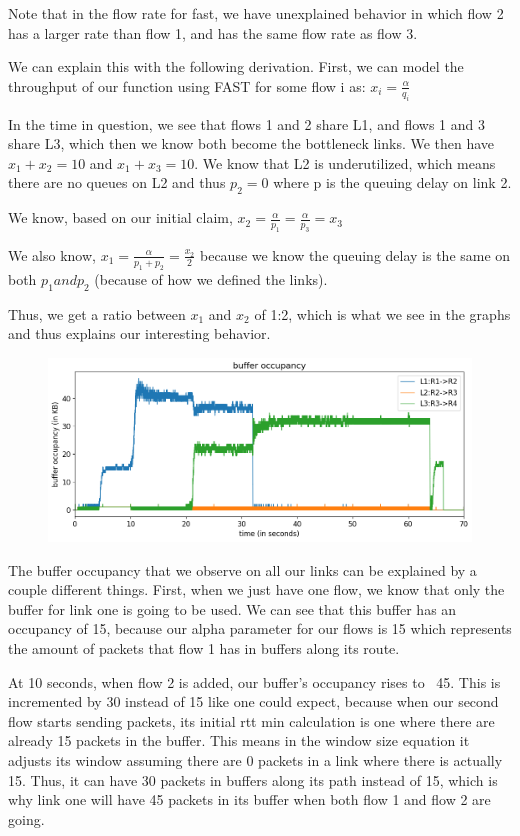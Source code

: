 \documentclass{article}
\begin{document}
Note that in the flow rate for fast, we have unexplained behavior in which flow 2 has a larger rate than flow 1, and has the same flow rate as flow 3. 

We can explain this with the following derivation. First, we can model the throughput of our function using FAST for some flow i as: $ x_i = \frac{\alpha}{q_i} $

In the time in question, we see that flows 1 and 2 share L1, and flows 1 and 3 share L3, which then we know both become the bottleneck links. We then have $x_1 + x_2 = 10 $ and $x_1 + x_3 = 10 $. We know that L2 is underutilized, which means there are no queues on L2 and thus $p_2 = 0 $ where p is the queuing delay on link 2.

We know, based on our initial claim, $ x_2 = \frac{\alpha}{p_1} = \frac{\alpha}{p_3}  = x_3$

We also know, $x_1 = \frac{\alpha}{p_1 + p_2} = \frac{x_2}{ 2}$ because we know the queuing delay is the same on both $p_1 and p_2$ (because of how we defined the links).

Thus, we get a ratio between $x_1$ and $x_2$ of 1:2, which is what we see in the graphs and thus explains our interesting behavior.

\begin{figure}[H]
\centering
\includegraphics[width = \textwidth]{test_case2_fast buffer occupancy.png}
\end{figure}

The buffer occupancy that we observe on all our links can be explained by a couple different things. First, when we just have one flow, we know that only the buffer for link one is going to be used. We can see that this buffer has an occupancy of 15, because our alpha parameter for our flows is 15 which represents the amount of packets that flow 1 has in buffers along its route. 

At 10 seconds, when flow 2 is added, our buffer's occupancy rises to ~45. This is incremented by 30 instead of 15 like one could expect, because when our second flow starts sending packets, its initial rtt min calculation is one where there are already 15 packets in the buffer. This means in the window size equation it adjusts its window assuming there are 0 packets in a link where there is actually 15. Thus, it can have 30 packets in buffers along its path instead of 15, which is why link one will have 45 packets in its buffer when both flow 1 and flow 2 are going.
\end{document}
